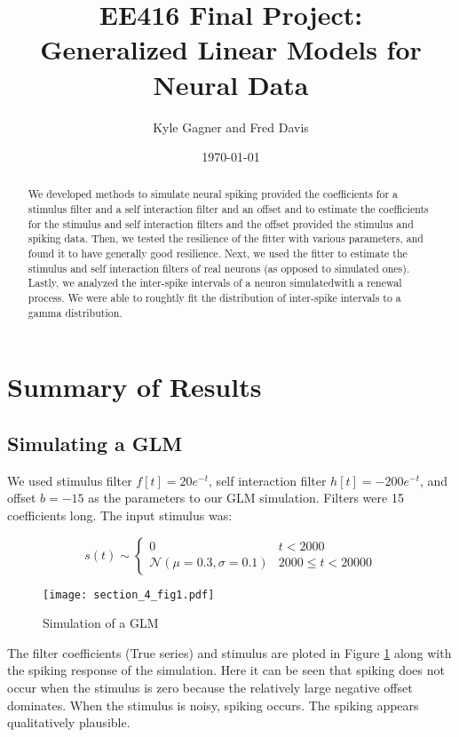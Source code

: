 \documentclass[letterpaper,titlepage,10pt]{article}
\title{EE416 Final Project:\\Generalized Linear Models for Neural Data}
\date{\today}
\author{Kyle Gagner and Fred Davis}
\begin{document}
\maketitle

\begin{abstract}

We developed methods to simulate neural spiking provided the coefficients for a stimulus filter and a self
interaction filter and an offset and to estimate the coefficients for the stimulus and self interaction
filters and the offset provided the stimulus and spiking data. Then, we tested the resilience of the fitter
with various parameters, and found it to have generally good resilience. Next, we used the fitter to estimate
the stimulus and self interaction filters of real neurons (as opposed to simulated ones). Lastly, we analyzed
the inter-spike intervals of a neuron simulatedwith a renewal process. We were able to roughtly fit the
distribution of inter-spike intervals to a gamma distribution.

\end{abstract}

\section{Summary of Results}

\subsection{Simulating a GLM}

We used stimulus filter $f[t]=20e^{-t}$, self interaction filter $h[t]=-200e^{-t}$, and offset $b=-15$ as the
parameters to our GLM simulation. Filters were 15 coefficients long. The input stimulus was:

$$s(t)\sim
\begin{cases}
0 & t < 2000\\
\mathcal{N}(\mu=0.3, \sigma=0.1) & 2000 \leq t < 20000
\end{cases}$$

\begin{figure}[H]
\texttt{[image: section\_4\_fig1.pdf]}
\caption{Simulation of a GLM}
\label{fig41}
\end{figure}

The filter coefficients (True series) and stimulus are ploted in Figure \ref{fig41} along with the spiking
response of the simulation. Here it can be seen that spiking does not occur when the stimulus is zero because the
relatively large negative offset dominates. When the stimulus is noisy, spiking occurs. The spiking appears
qualitatively plausible.
\end{document}
